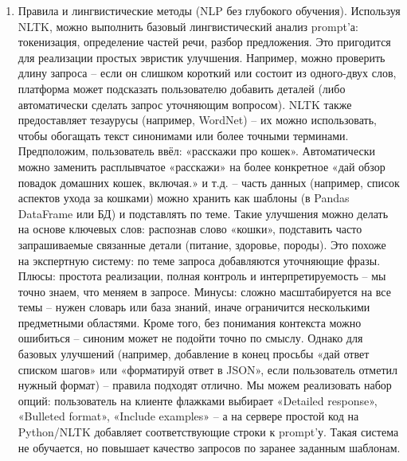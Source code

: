 \begin{enumerate}[label=\arabic*]

\item Правила и лингвистические методы (NLP без глубокого обучения). Используя NLTK, можно выполнить базовый лингвистический анализ prompt’а: токенизация, определение частей речи, разбор предложения. Это пригодится для реализации простых эвристик улучшения. Например, можно проверить длину запроса – если он слишком короткий или состоит из одного-двух слов, платформа может подсказать пользователю добавить деталей (либо автоматически сделать запрос уточняющим вопросом). NLTK также предоставляет тезаурусы (например, WordNet) – их можно использовать, чтобы обогащать текст синонимами или более точными терминами. Предположим, пользователь ввёл: «расскажи про кошек». Автоматически можно заменить расплывчатое «расскажи» на более конкретное «дай обзор повадок домашних кошек, включая.» и т.д. – часть данных (например, список аспектов ухода за кошками) можно хранить как шаблоны (в Pandas DataFrame или БД) и подставлять по теме. Такие улучшения можно делать на основе ключевых слов: распознав слово «кошки», подставить часто запрашиваемые связанные детали (питание, здоровье, породы). Это похоже на экспертную систему: по теме запроса добавляются уточняющие фразы. Плюсы: простота реализации, полная контроль и интерпретируемость – мы точно знаем, что меняем в запросе. Минусы: сложно масштабируется на все темы – нужен словарь или база знаний, иначе ограничится несколькими предметными областями. Кроме того, без понимания контекста можно ошибиться – синоним может не подойти точно по смыслу. Однако для базовых улучшений (например, добавление в конец просьбы «дай ответ списком шагов» или «форматируй ответ в JSON», если пользователь отметил нужный формат) – правила подходят отлично. Мы можем реализовать набор опций: пользователь на клиенте флажками выбирает «Detailed response», «Bulleted format», «Include examples» – а на сервере простой код на Python/NLTK добавляет соответствующие строки к prompt’у. Такая система не обучается, но повышает качество запросов по заранее заданным шаблонам.


\end{enumerate}
